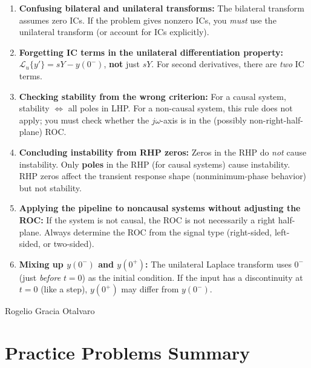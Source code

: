 \documentclass[11pt]{article}
\begin{document}
\begin{enumerate}
  \item \textbf{Confusing bilateral and unilateral transforms:} The bilateral transform assumes zero ICs. If the problem gives nonzero ICs, you \textit{must} use the unilateral transform (or account for ICs explicitly).
  \item \textbf{Forgetting IC terms in the unilateral differentiation property:} $\mathcal{L}_u\{y'\} = sY - y(0^-)$, \textbf{not} just $sY$. For second derivatives, there are \textit{two} IC terms.
  \item \textbf{Checking stability from the wrong criterion:} For a causal system, stability $\Leftrightarrow$ all poles in LHP. For a non-causal system, this rule does not apply; you must check whether the $j\omega$-axis is in the (possibly non-right-half-plane) ROC.
  \item \textbf{Concluding instability from RHP zeros:} Zeros in the RHP do \textit{not} cause instability. Only \textbf{poles} in the RHP (for causal systems) cause instability. RHP zeros affect the transient response shape (nonminimum-phase behavior) but not stability.
  \item \textbf{Applying the pipeline to noncausal systems without adjusting the ROC:} If the system is not causal, the ROC is not necessarily a right half-plane. Always determine the ROC from the signal type (right-sided, left-sided, or two-sided).
  \item \textbf{Mixing up $y(0^-)$ and $y(0^+)$:} The unilateral Laplace transform uses $0^-$ (just \textit{before} $t = 0$) as the initial condition. If the input has a discontinuity at $t = 0$ (like a step), $y(0^+)$ may differ from $y(0^-)$.
\end{enumerate}

Rogelio Gracia Otalvaro

\section*{Practice Problems Summary}
\end{document}
